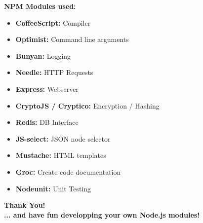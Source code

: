 \documentclass[x11names]{beamer}
\begin{document}
\begin{frame}
\textbf{NPM Modules used:}
\begin{itemize}
  \item<1-> \textbf{CoffeeScript:} Compiler
  \item<2-> \textbf{Optimist:} Command line arguments 
  \item<3-> \textbf{Bunyan:} Logging
  \item<4-> \textbf{Needle:} HTTP Requests
  \item<5-> \textbf{Express:} Webserver
  \item<6-> \textbf{CryptoJS / Cryptico:} Encryption / Hashing
  \item<7-> \textbf{Redis:} DB Interface
  \item<8-> \textbf{JS-select:} JSON node selector
  \item<9-> \textbf{Mustache:} HTML templates
  \item<10-> \textbf{Groc:} Create code documentation
  \item<11-> \textbf{Nodeunit:} Unit Testing
\end{itemize}
\end{frame}

\begin{frame}
\begin{center}
\textbf{Thank You!\\
\vspace*{0.5\baselineskip}
... and have fun developping your own Node.js modules!}
\end{center}
\end{frame}
\end{document}
